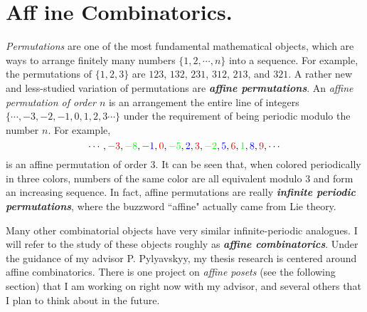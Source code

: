 \documentclass[11pt]{amsart}
\newcommand{\Emph}[1]{\textbf{\emph{#1}}}
\begin{document}
\section{Aff ine Combinatorics.}
 \emph{Permutations} are one of the most fundamental mathematical objects, which are ways to arrange finitely many numbers $\{1,2,\cdots,n\}$ into a sequence. For example, the permutations of $\{1,2,3\}$ are $123$, $132$, $231$, $312$, $213$, and $321$. %
A rather new and less-studied variation of permutations are  \Emph{affine permutations}. An \emph{affine permutation of order $n$} is an arrangement the entire line of integers $\{\cdots,-3,-2,-1,0,1,2,3\cdots\}$ under the requirement of being periodic modulo the number $n$. For example,
\[\cdots,{\color{red}-3},{\color{green}{-8}},{\color{blue}-1},{\color{red}0},{\color{green}-5},{\color{blue}2}, {\color{red}3},{\color{green}-2},{\color{blue}5} ,{\color{red}6},{\color{green}1},{\color{blue}8},{\color{red}9},\cdots\]
is an affine permutation of order $3$. It can be seen that, when colored periodically in three colors, numbers of the same color are all equivalent modulo $3$ and form an increasing sequence. In fact, affine permutations are really \Emph{infinite periodic permutations}, where the buzzword ``affine" actually came from Lie theory. 

Many other combinatorial objects have very similar infinite-periodic analogues. I will refer to the study of these objects roughly as \Emph{affine combinatorics}.
Under the guidance of my advisor P. Pylyavskyy, my thesis research is centered around affine combinatorics. There is one project on \emph{affine posets} (see the following section) that I am working on right now with my advisor, and several others that I plan to think about in the future.
\end{document}
